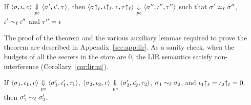 \begin{myThm}
\label{thm:lir:csim}
If 
$\langle \sigma, \iota, \mathit{c} \rangle {~\underset{\mathit{pc}}{\Downarrow}~} \langle \sigma', \iota',
\tau \rangle$,  then 
$\langle \sigma{\uparrow_\ell}, \iota{\uparrow_\ell}, \mathit{c}, \tau{\uparrow_\ell}
\rangle  {~\underset{\mathit{pc}}{\downarrow}~} \langle \sigma'',\iota'',
\tau'' \rangle$ such that $\sigma' \simeq_\ell \sigma''$,
$\iota' \sim_\ell \iota''$ and $\tau'' = \epsilon$
\end{myThm}

The proof of the theorem and the various auxiliary lemmas 
required to prove the theorem are described in
Appendix~\ref{sec:app:lir}.  As a sanity check, when the budgets of
all the secrets in the store are $0$, the LIR semantics satisfy
non-interference (Corollary~\ref{cor:lir:ni}). 

\begin{mycor}
\label{cor:lir:ni}
If $\langle \sigma_1, \iota_1, \mathit{c} \rangle
{~\underset{\mathit{pc}}{\Downarrow}~} \langle \sigma_1', \iota_1', \tau_1 \rangle$, 
 $\langle \sigma_2, \iota_2, \mathit{c} \rangle
{~\underset{\mathit{pc}}{\Downarrow}~} \langle \sigma_2', \iota_2', \tau_2 \rangle$, 
 $\sigma_1 \sim_\ell \sigma_2$, and $\iota_1{\uparrow_\ell} = \iota_2{\uparrow_\ell} = 0$, 
then $\sigma_1' \sim_\ell \sigma_2'$.
\end{mycor}

